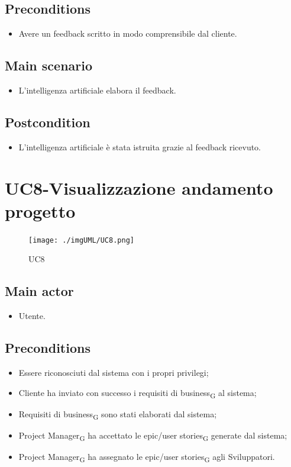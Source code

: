 \documentclass{article}
\begin{document}
     \subsection*{Preconditions} 
        \begin{itemize}
            \item Avere un feedback scritto in modo comprensibile dal cliente.
        \end{itemize}
        \subsection*{Main scenario}
        \begin{itemize}
            \item L'intelligenza artificiale elabora il feedback.
        \end{itemize}
        \subsection*{Postcondition} 
        \begin{itemize}
            \item L'intelligenza artificiale è stata istruita grazie al feedback ricevuto.
        \end{itemize}
        

\section{UC8-Visualizzazione andamento progetto}
    \begin{figure}[h]
      \centering
      \texttt{[image: ./imgUML/UC8.png]}
        \caption{UC8}
      \label{fig:UC8}
    \end{figure}
    
    \subsection*{Main actor}
        \begin{itemize}
            \item Utente.
        \end{itemize}
        
    \subsection*{Preconditions}
        \begin{itemize}
            \item Essere riconosciuti dal sistema con i propri privilegi;
            \item Cliente ha inviato con successo i requisiti di business\textsubscript{G} al sistema;
            \item Requisiti di business\textsubscript{G} sono stati elaborati dal sistema;
            \item Project Manager\textsubscript{G} ha accettato le epic/user stories\textsubscript{G} generate dal sistema;
            \item Project Manager\textsubscript{G} ha assegnato le epic/user stories\textsubscript{G} agli Sviluppatori.
        \end{itemize}
        
\end{document}
